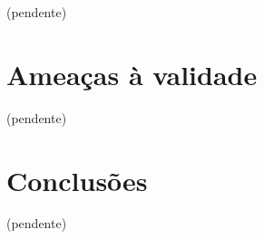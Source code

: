(pendente)

\section{Ameaças à validade}

(pendente)

\section{Conclusões} \label{estudo3:conclusoes}

(pendente)





